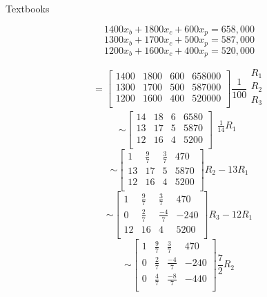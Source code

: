 \documentclass[12pt]{article}
\newenvironment{problem}[2][Problem]{\begin{trivlist}
\item[\hskip \labelsep {\bfseries #1}\hskip \labelsep {\bfseries #2.}]}{\end{trivlist}}
\begin{document}
\begin{problem}{7}
	Textbooks
\end{problem}
	\[1400 x_b + 1800 x_c + 600 x_p = 658,000\]
	\[1300 x_b + 1700 x_c + 500 x_p = 587,000\]
	\[1200 x_b + 1600 x_c + 400 x_p = 520,000\]
	
	\[=
		\left[
		\begin{array}{ccc|c}
		1400 & 1800 & 600 & 658000\\
		1300 & 1700 & 500 & 587000\\
		1200 & 1600 & 400 & 520000\\
		\end{array}
		\right] \frac{1}{100} \begin{matrix}R_1\\R_2\\R_3\\\end{matrix}
	\]
	\[\sim
		\left[
		\begin{array}{ccc|c}
		14 & 18 & 6 & 6580\\
		13 & 17 & 5 & 5870\\
		12 & 16 & 4 & 5200\\
		\end{array}
		\right] \begin{matrix} \frac{1}{14} R_1\\\\\ \end{matrix}
	\]
	\[\sim
		\left[
		\begin{array}{ccc|c}
		1 & \frac{9}{7} & \frac{3}{7} & 470\\
		13 & 17 & 5 & 5870\\
		12 & 16 & 4 & 5200\\
		\end{array}
		\right] R_2 - 13R_1
	\]
	\[\sim
		\left[
		\begin{array}{ccc|c}
		1 & \frac{9}{7} & \frac{3}{7} & 470\\
		0 & \frac{2}{7} & \frac{-4}{7} & -240\\
		12 & 16 & 4 & 5200\\
		\end{array}
		\right]  R_3 - 12R_1
	\]
	\[\sim
		\left[
		\begin{array}{ccc|c}
		1 & \frac{9}{7} & \frac{3}{7} & 470\\
		0 & \frac{2}{7} & \frac{-4}{7} & -240\\
		0 & \frac{4}{7} & \frac{-8}{7} & -440\\
		\end{array}
		\right] \frac{7}{2}R_2
	\]
\end{document}
